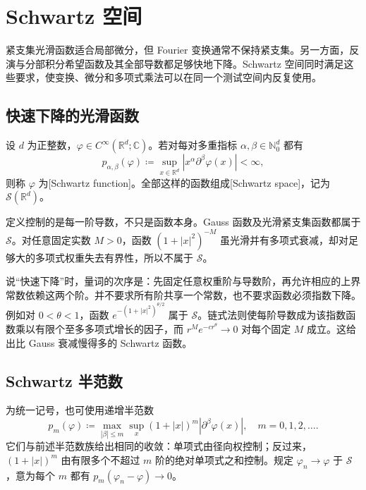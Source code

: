 \section{Schwartz 空间}
\label{b2:sec:0501}

紧支集光滑函数适合局部微分，但 Fourier 变换通常不保持紧支集。另一方面，反演与分部积分希望函数及其全部导数都足够快地下降。Schwartz 空间同时满足这些要求，使变换、微分和多项式乘法可以在同一个测试空间内反复使用。

\subsection{快速下降的光滑函数}
\label{b2:subsec:050101}

\begin{definition}\label{b2:def:05-schwartz}
设 \(d\) 为正整数，\(\varphi\in C^\infty(\mathbb R^d;\mathbb C)\)。若对每对多重指标 \(\alpha,\beta\in\mathbb N_0^d\) 都有
\[
 p_{\alpha,\beta}(\varphi)\coloneqq
 \sup_{x\in\mathbb R^d}|x^\alpha\partial^\beta\varphi(x)|<\infty,
\]
则称 \(\varphi\) 为[Schwartz function]。全部这样的函数组成[Schwartz space]，记为 \(\mathcal S(\mathbb R^d)\)。
\end{definition}

定义控制的是每一阶导数，不只是函数本身。Gauss 函数及光滑紧支集函数都属于 \(\mathcal S\)。对任意固定实数 \(M>0\)，函数 \((1+|x|^2)^{-M}\) 虽光滑并有多项式衰减，却对足够大的多项式权重失去有界性，所以不属于 \(\mathcal S\)。

\ProseParagraphBreak

说“快速下降”时，量词的次序是：先固定任意权重阶与导数阶，再允许相应的上界常数依赖这两个阶。并不要求所有阶共享一个常数，也不要求函数必须指数下降。例如对 \(0<\theta<1\)，函数 \(e^{-(1+|x|^2)^{\theta/2}}\) 属于 \(\mathcal S\)。链式法则使每阶导数成为该指数函数乘以有限个至多多项式增长的因子，而 \(r^Me^{-cr^\theta}\to0\) 对每个固定 \(M\) 成立。这给出比 Gauss 衰减慢得多的 Schwartz 函数。

\subsection{Schwartz 半范数}
\label{b2:subsec:050102}

为统一记号，也可使用递增半范数
\[
 p_m(\varphi)\coloneqq
 \max_{|\beta|\leq m}\sup_x(1+|x|)^m|\partial^\beta\varphi(x)|,
 \quad m=0,1,2,\ldots.
\]
它们与前述半范数族给出相同的收敛：单项式由径向权控制；反过来，\((1+|x|)^m\) 由有限多个不超过 \(m\) 阶的绝对单项式之和控制。规定 \(\varphi_n\to\varphi\) 于 \(\mathcal S\)，意为每个 \(m\) 都有 \(p_m(\varphi_n-\varphi)\to0\)。

